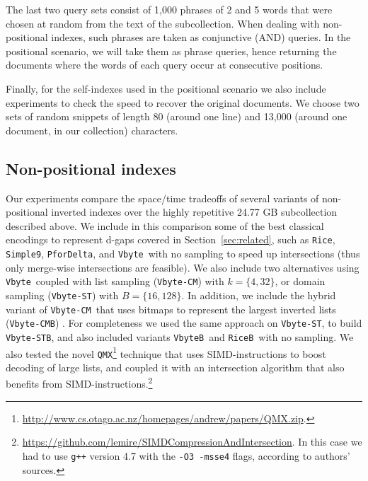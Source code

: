 \documentclass[review]{elsarticle}
\newcommand{\vbyte}{\texttt{Vbyte}}
\newcommand{\vbyteB}{\texttt{VbyteB}}
\newcommand{\rice}{\texttt{Rice}}
\newcommand{\riceB}{\texttt{RiceB}}
\newcommand{\simplen}{\texttt{Simple9}}
\newcommand{\pfordelta}{\texttt{PforDelta}}
\newcommand{\qmx}{\texttt{QMX}}
\newcommand{\vbyteCM}{\texttt{Vbyte-CM}}
\newcommand{\vbyteCMB}{\texttt{Vbyte-CMB}}
\newcommand{\vbyteST}{\texttt{Vbyte-ST}}
\newcommand{\vbyteSTB}{\texttt{Vbyte-STB}}
\begin{document}
The last two query sets consist of 1,000 phrases of 2 and 5 
words that were chosen at random from the text of the subcollection. When dealing 
with non-positional indexes, such phrases are taken as conjunctive (AND) queries. In the positional scenario, we will take them as phrase queries, hence returning the documents where the words of each query occur at consecutive positions.

Finally, for the self-indexes used in the positional scenario we also include experiments 
to check the speed to recover the original documents. We choose two sets
of random snippets of length 80 (around one line) and 13,000 (around one document, in our
collection) characters. 








\subsection{Non-positional indexes}

Our experiments compare the space/time tradeoffs of several variants of 
non-positional inverted indexes over the highly repetitive 24.77 GB subcollection described above. We include in this comparison some of the best classical encodings to represent d-gaps covered in Section~\ref{sec:related}, such as \rice, \simplen, 
\pfordelta, and \vbyte\ with no sampling to speed up intersections (thus only merge-wise intersections are feasible). 
We also include two alternatives using \vbyte\ coupled with list sampling \cite{CM10} (\vbyteCM) with $k=\{4,32\}$, or domain sampling \cite{TS10} (\vbyteST) with $B=\{16,128\}$. In addition, we include the hybrid variant of \vbyteCM\ that uses bitmaps to represent the largest inverted lists (\vbyteCMB) \cite{CM10}. For completeness we used the same approach on \vbyteST, to build \vbyteSTB, and also included variants \vbyteB\ and \riceB\ with no sampling.
We also tested the novel \qmx\footnote{\url{http://www.cs.otago.ac.nz/homepages/andrew/papers/QMX.zip}. } technique \cite{trotman2014} that uses SIMD-instructions to boost decoding of large lists, and coupled it with an intersection algorithm \cite{Lemire2015:simdInt} that also benefits from SIMD-instructions.\footnote{ \url{https://github.com/lemire/SIMDCompressionAndIntersection}. In this case we had to use \texttt{g++} version 4.7 with the \texttt{-O3 -msse4} flags, according to authors' sources.}
\end{document}
